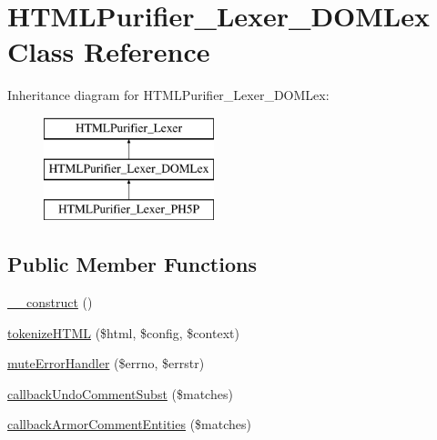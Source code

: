 \hypertarget{classHTMLPurifier__Lexer__DOMLex}{\section{H\+T\+M\+L\+Purifier\+\_\+\+Lexer\+\_\+\+D\+O\+M\+Lex Class Reference}
\label{classHTMLPurifier__Lexer__DOMLex}
}
Inheritance diagram for H\+T\+M\+L\+Purifier\+\_\+\+Lexer\+\_\+\+D\+O\+M\+Lex\+:\begin{figure}[H]
\begin{center}
\leavevmode
\includegraphics[height=3.000000cm]{classHTMLPurifier__Lexer__DOMLex}
\end{center}
\end{figure}
\subsection*{Public Member Functions}
\begin{DoxyCompactItemize}
\item 
\hyperlink{classHTMLPurifier__Lexer__DOMLex_a0c5ad34f693df6e6ee52c582c8f12085}{\+\_\+\+\_\+construct} ()
\item 
\hyperlink{classHTMLPurifier__Lexer__DOMLex_a8f04a9cf657a93ce0c8be04703e420bf}{tokenize\+H\+T\+M\+L} (\$html, \$config, \$context)
\item 
\hyperlink{classHTMLPurifier__Lexer__DOMLex_ae2e6da3ca735f2dc96ed168c3c1360e4}{mute\+Error\+Handler} (\$errno, \$errstr)
\item 
\hyperlink{classHTMLPurifier__Lexer__DOMLex_a389e02879e6d1d2e634d447599d673c8}{callback\+Undo\+Comment\+Subst} (\$matches)
\item 
\hyperlink{classHTMLPurifier__Lexer__DOMLex_a21737bf53ad6c628c6c2777c5451446a}{callback\+Armor\+Comment\+Entities} (\$matches)
\end{DoxyCompactItemize}
